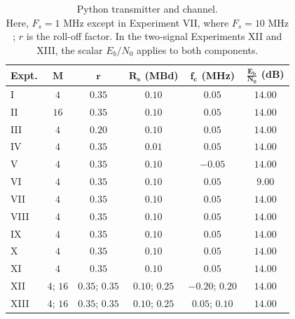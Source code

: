 \begin{table}[H]
\begin{center}
\caption[Python transmitter and channel.]{Python transmitter and channel. \\
Here, $F_{s}=1\text{ MHz}$ except in Experiment VII, where $F_s=10\text{ MHz}$; $r$ is the roll-off factor.  In the two-signal Experiments XII and XIII, the scalar $E_b/N_0$ applies to both components.}
\label{tab:tx}
\begin{tabular}{|l|c|c|c|c|c|}
\hline
\textbf{Expt.} & $\bm{M}$ & $\bm{r}$ & $\bm{R_{s}}$ \textbf{(MBd)} & $\bm{f_{c}}$ \textbf{(MHz)} & $\bm{\frac{E_{b}}{N_{0}}}$ \textbf{(dB)} \\
\hline
I    & $4$        & $0.35$         & $0.10$         & $0.05$          & $14.00$ \\
\hline
II   & $16$       & $0.35$         & $0.10$         & $0.05$          & $14.00$ \\
\hline
III  & $4$        & $0.20$         & $0.10$         & $0.05$          & $14.00$ \\
\hline
IV   & $4$        & $0.35$         & $0.01$         & $0.05$          & $14.00$ \\
\hline
V    & $4$        & $0.35$         & $0.10$         & $-0.05$         & $14.00$ \\
\hline
VI   & $4$        & $0.35$         & $0.10$         & $0.05$          & $9.00$  \\
\hline
VII  & $4$        & $0.35$         & $0.10$         & $0.05$          & $14.00$ \\
\hline
VIII & $4$        & $0.35$         & $0.10$         & $0.05$          & $14.00$ \\
\hline
IX   & $4$        & $0.35$         & $0.10$         & $0.05$          & $14.00$ \\
\hline
X    & $4$        & $0.35$         & $0.10$         & $0.05$          & $14.00$ \\
\hline
XI   & $4$        & $0.35$         & $0.10$         & $0.05$          & $14.00$ \\
\hline
XII  & $4$; $16$  & $0.35$; $0.35$ & $0.10$; $0.25$ & $-0.20$; $0.20$ & $14.00$ \\
\hline
XIII & $4$; $16$  & $0.35$; $0.35$ & $0.10$; $0.25$ & $0.05$; $0.10$  & $14.00$ \\
\hline
\end{tabular}
\end{center}
\end{table}


